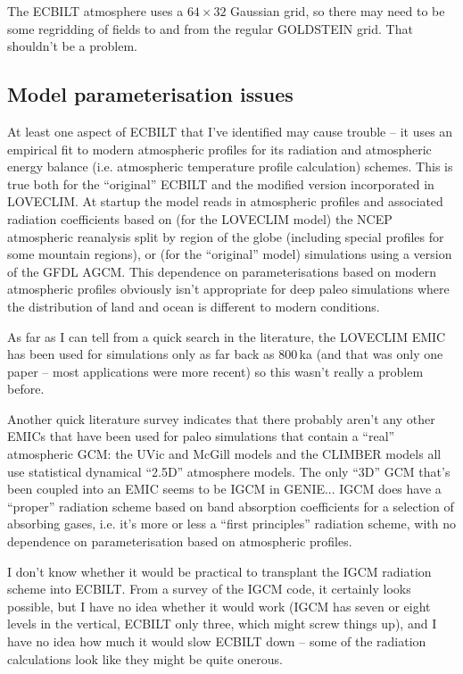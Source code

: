 \documentclass[a4paper,11pt]{article}
\begin{document}
The ECBILT atmosphere uses a $64 \times 32$ Gaussian grid, so there
may need to be some regridding of fields to and from the regular
GOLDSTEIN grid.  That shouldn't be a problem.

\subsection{Model parameterisation issues}

At least one aspect of ECBILT that I've identified may cause trouble
-- it uses an empirical fit to modern atmospheric profiles for its
radiation and atmospheric energy balance (i.e. atmospheric temperature
profile calculation) schemes.  This is true both for the ``original''
ECBILT and the modified version incorporated in LOVECLIM.  At startup
the model reads in atmospheric profiles and associated radiation
coefficients based on (for the LOVECLIM model) the NCEP atmospheric
reanalysis split by region of the globe (including special profiles
for some mountain regions), or (for the ``original'' model)
simulations using a version of the GFDL AGCM.  This dependence on
parameterisations based on modern atmospheric profiles obviously isn't
appropriate for deep paleo simulations where the distribution of land
and ocean is different to modern conditions.

As far as I can tell from a quick search in the literature, the
LOVECLIM EMIC has been used for simulations only as far back as
800\,ka (and that was only one paper -- most applications were more
recent) so this wasn't really a problem before.

Another quick literature survey indicates that there probably aren't
any other EMICs that have been used for paleo simulations that contain
a ``real'' atmospheric GCM: the UVic and McGill models and the CLIMBER
models all use statistical dynamical ``2.5D'' atmosphere models.  The
only ``3D'' GCM that's been coupled into an EMIC seems to be IGCM in
GENIE...  IGCM does have a ``proper'' radiation scheme based on
band absorption coefficients for a selection of absorbing gases,
i.e. it's more or less a ``first principles'' radiation scheme, with
no dependence on parameterisation based on atmospheric profiles.

I don't know whether it would be practical to transplant the IGCM
radiation scheme into ECBILT.  From a survey of the IGCM code, it
certainly looks possible, but I have no idea whether it would work
(IGCM has seven or eight levels in the vertical, ECBILT only three,
which might screw things up), and I have no idea how much it would
slow ECBILT down -- some of the radiation calculations look like they
might be quite onerous.
\end{document}
